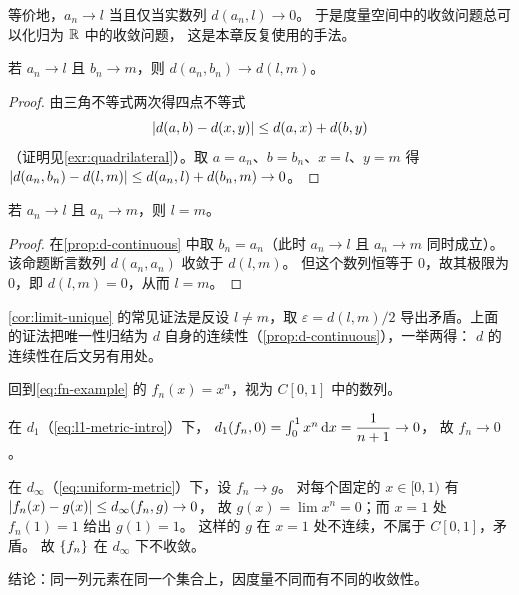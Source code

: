 等价地，\(a_{n} \to l\) 当且仅当实数列 \(d(a_{n},l) \to 0\)。
于是度量空间中的收敛问题总可以化归为 \(\mathbb{R}\) 中的收敛问题，
这是本章反复使用的手法。

\begin{proposition}
  \label{prop:d-continuous}
  若 \(a_{n} \to l\) 且 \(b_{n} \to m\)，则 \(d(a_{n},b_{n}) \to d(l,m)\)。
\end{proposition}

\begin{proof}
  由三角不等式两次得四点不等式
  \begin{equation}
    \label{eq:quadrilateral}
    \lvert d(a,b) - d(x,y)\rvert \le d(a,x) + d(b,y)
  \end{equation}
  （证明见\cref{exr:quadrilateral}）。取 \(a=a_{n}\)、\(b=b_{n}\)、\(x=l\)、\(y=m\) 得
  \(\lvert d(a_{n},b_{n}) - d(l,m)\rvert \le d(a_{n},l) + d(b_{n},m) \to 0\)。
\end{proof}

\begin{corollary}[极限唯一]
  \label{cor:limit-unique}
  若 \(a_{n} \to l\) 且 \(a_{n} \to m\)，则 \(l = m\)。
\end{corollary}

\begin{proof}
  在\cref{prop:d-continuous} 中取 \(b_{n} = a_{n}\)（此时 \(a_{n} \to l\) 且
  \(a_{n} \to m\) 同时成立）。该命题断言数列 \(d(a_{n},a_{n})\) 收敛于 \(d(l,m)\)。
  但这个数列恒等于 \(0\)，故其极限为 \(0\)，即 \(d(l,m)=0\)，从而 \(l=m\)。
\end{proof}

\begin{remark}
  \cref{cor:limit-unique} 的常见证法是反设 \(l \neq m\)，取
  \(\varepsilon = d(l,m)/2\) 导出矛盾。上面的证法把唯一性归结为
  \(d\) 自身的连续性（\cref{prop:d-continuous}），一举两得：
  \(d\) 的连续性在后文另有用处。
\end{remark}

\begin{example}
  \label{ex:convergence-differs}
  回到\cref{eq:fn-example} 的 \(f_{n}(x) = x^{n}\)，视为 \(C[0,1]\) 中的数列。
  \begin{worked}
    在 \(d_{1}\)（\cref{eq:l1-metric-intro}）下，
    \(d_{1}(f_{n}, 0) = \int_{0}^{1} x^{n} \mathop{}\!\mathrm{d} x = \dfrac{1}{n+1} \to 0\)，
    故 \(f_{n} \to 0\)。

    在 \(d_{\infty}\)（\cref{eq:uniform-metric}）下，设 \(f_{n} \to g\)。
    对每个固定的 \(x \in [0,1)\) 有 \(\lvert f_{n}(x)-g(x)\rvert \le d_{\infty}(f_{n},g) \to 0\)，
    故 \(g(x) = \lim x^{n} = 0\)；而 \(x=1\) 处 \(f_{n}(1)=1\) 给出 \(g(1)=1\)。
    这样的 \(g\) 在 \(x=1\) 处不连续，不属于 \(C[0,1]\)，矛盾。
    故 \(\{f_{n}\}\) 在 \(d_{\infty}\) 下不收敛。

    结论：同一列元素在同一个集合上，因度量不同而有不同的收敛性。
  \end{worked}
\end{example}

